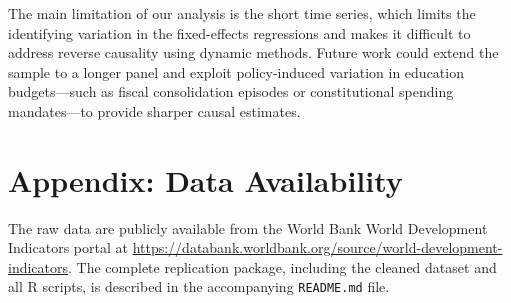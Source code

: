 \documentclass[12pt,a4paper]{article}
\begin{document}
The main limitation of our analysis is the short time series, which limits the
identifying variation in the fixed-effects regressions and makes it difficult to
address reverse causality using dynamic methods. Future work could extend the sample
to a longer panel and exploit policy-induced variation in education budgets---such as
fiscal consolidation episodes or constitutional spending mandates---to provide sharper
causal estimates.

\newpage



\appendix

\section*{Appendix: Data Availability}

The raw data are publicly available from the World Bank World Development Indicators
portal at \url{https://databank.worldbank.org/source/world-development-indicators}.
The complete replication package, including the cleaned dataset and all R scripts,
is described in the accompanying \texttt{README.md} file.
\end{document}
